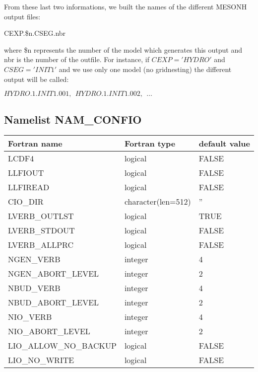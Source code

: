 From these last two informations, we built the names of the different MESONH
output files: 

CEXP.\$n.CSEG.nbr

where \$n represents the number of the model which generates this output and nbr
is the number of the outfile. For instance, if $CEXP='HYDRO'$ and $CSEG='INIT1'$
and we use only  one model (no gridnesting) the different output will be called:

$HYDRO.1.INIT1.001 , \ \ HYDRO.1.INIT1.002, \ \ \ldots$
\subsection{Namelist NAM\_CONFIO}\label{s:namconfio}

\begin{center}
\begin{tabular} {|l|l|l|}
\hline
Fortran name & Fortran type & default value \\
\hline
LCDF4      & logical  & FALSE  \\
LLFIOUT    & logical  & FALSE  \\
LLFIREAD   & logical  & FALSE  \\
\hline
CIO\_DIR & character(len=512) & '' \\
\hline
LVERB\_OUTLST      & logical & TRUE  \\
LVERB\_STDOUT      & logical & FALSE \\
LVERB\_ALLPRC      & logical & FALSE \\
NGEN\_VERB         & integer & 4 \\
NGEN\_ABORT\_LEVEL & integer & 2 \\
NBUD\_VERB         & integer & 4 \\
NBUD\_ABORT\_LEVEL & integer & 2 \\
NIO\_VERB          & integer & 4 \\
NIO\_ABORT\_LEVEL  & integer & 2 \\
\hline
LIO\_ALLOW\_NO\_BACKUP & logical & FALSE \\
LIO\_NO\_WRITE         & logical & FALSE \\
\hline
\end{tabular}
\end{center}

